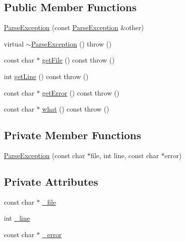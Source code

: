 \subsection*{Public Member Functions}
\begin{DoxyCompactItemize}
\item 
\hyperlink{classlibconfig_1_1ParseException_af4ca2a2b778b7b25e96620a816ac1122}{Parse\-Exception} (const \hyperlink{classlibconfig_1_1ParseException}{Parse\-Exception} \&other)
\item 
virtual \hyperlink{classlibconfig_1_1ParseException_a5bf6aa3e7294e7d07bfd04b384fb4949}{$\sim$\-Parse\-Exception} ()  throw ()
\item 
const char $\ast$ \hyperlink{classlibconfig_1_1ParseException_a948a2d4211dd6f579ac55cf91c7b7e64}{get\-File} () const   throw ()
\item 
int \hyperlink{classlibconfig_1_1ParseException_ac63b7930920082fcbfe48124fe1705a4}{get\-Line} () const   throw ()
\item 
const char $\ast$ \hyperlink{classlibconfig_1_1ParseException_a9ff389ad37d4208f5d29a3b1b26fff58}{get\-Error} () const   throw ()
\item 
const char $\ast$ \hyperlink{classlibconfig_1_1ParseException_ab2f096f652382ceacd418c5d8104f0c5}{what} () const   throw ()
\end{DoxyCompactItemize}
\subsection*{Private Member Functions}
\begin{DoxyCompactItemize}
\item 
\hyperlink{classlibconfig_1_1ParseException_a6aad54b715c39de28a0ff8c1b1209de7}{Parse\-Exception} (const char $\ast$file, int line, const char $\ast$error)
\end{DoxyCompactItemize}
\subsection*{Private Attributes}
\begin{DoxyCompactItemize}
\item 
const char $\ast$ \hyperlink{classlibconfig_1_1ParseException_aa9b51ef81102559a811ae7371b38617f}{\-\_\-file}
\item 
int \hyperlink{classlibconfig_1_1ParseException_a4e478e6b2177c927c71f40387e5ed867}{\-\_\-line}
\item 
const char $\ast$ \hyperlink{classlibconfig_1_1ParseException_a4611bdffd67b8c4934bf43b7802bdc73}{\-\_\-error}
\end{DoxyCompactItemize}
